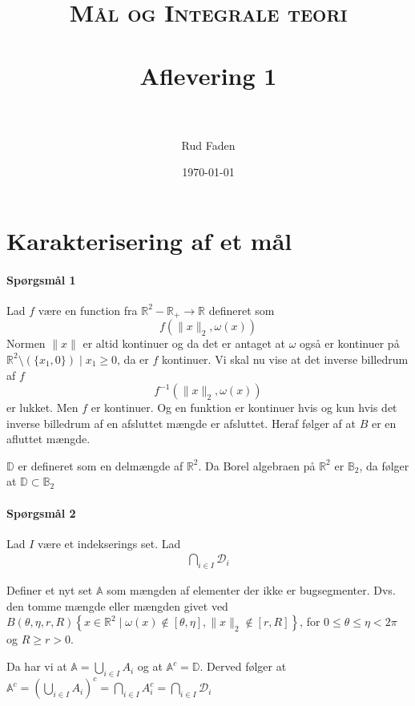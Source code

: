 \message{ !name(Aflevering1.tex)}\documentclass[paper=a4, fontsize=11pt]{scrartcl} %
\title{
\normalfont \normalsize
\textsc{Mål og Integrale teori} \\ [25pt] %
\horrule{0.5pt} \\[0.4cm] %
\huge Aflevering 1 \\ %
\horrule{2pt} \\[0.5cm] %
}
\author{Rud Faden} %
\date{\normalsize\today} %
\numberwithin{equation}{section} %
\numberwithin{figure}{section} %
\numberwithin{table}{section} %
\begin{document}


\maketitle %


\section{Karakterisering af et mål}

\paragraph{Spørgsmål 1}
Lad \(f\) være en function fra \(\mathbb{R}^2-\mathbb{R}_+ \rightarrow \mathbb{R}\) defineret som
\[
	f(\|x\|_2,\omega(x))
\]
Normen \(\| x\| \) er altid kontinuer og da det er antaget at \(\omega\) også er kontinuer på \(\mathbb{R}^2\setminus(\{x_1,0\})\mid x_1 \geq 0\), da er \(f\) kontinuer. Vi skal nu vise at det inverse billedrum af \(f\)
\[
	f^{-1}(\|x\|_2,\omega(x))
\]
er lukket. Men \(f\) er kontinuer.  Og en funktion er kontinuer hvis og kun hvis det inverse billedrum af en afsluttet mængde er afsluttet. Heraf følger af at \(B\) er en afluttet mængde.

\(\mathbb{D}\) er defineret som en delmængde af \(\mathbb{R}^2\). Da Borel algebraen på \(\mathbb{R}^2\) er \(\mathbb{B}_2\), da følger at \(\mathbb{D}\subset\mathbb{B}_2\)

\paragraph{Spørgsmål 2} Lad \(I\) være et indekserings set. Lad
\begin{align}
	\bigcap_{i\in I} \mathcal{D}_i \label{eq:q2-1}
\end{align}

Definer et nyt set \(\mathbb{A}\) som mængden af elementer der ikke er bugsegmenter. Dvs. den tomme mængde eller mængden givet ved \(B(\theta,\eta,r,R)\left\{x\in\mathbb{R}^2\mid \omega(x)\notin [\theta,\eta], \| x\|_2 \notin [r,R]\right\}\), for \(0\leq\theta \leq \eta <2\pi\) og \(R\geq r>0\).

	Da har vi at \(\mathbb{A}=\bigcup_{i\in I}A_i\) og at \(\mathbb{A}^c=\mathbb{D}\). Derved følger at \(\mathbb{A}^c=\left( \bigcup_{i\in I}A_i\right)^c=\bigcap_{i\in I}A_i^c=\bigcap_{i\in I}\mathcal{D}_i\)
\end{document}
